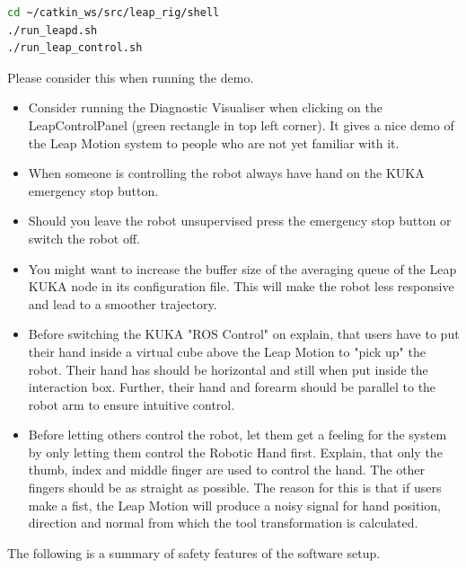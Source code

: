 \documentclass[headsepline,footinclude=false,fontsize=11pt,paper=a4,listof=totoc,bibliography=totoc,BCOR=12mm,DIV=14]{scrbook}
\begin{document}
\begin{lstlisting}[language=bash, caption={Launching Leap Rig demo}, label={shell}]
cd ~/catkin_ws/src/leap_rig/shell
./run_leapd.sh
./run_leap_control.sh
\end{lstlisting}


Please consider this when running the demo.
\begin{itemize}
	\item Consider running the Diagnostic Visualiser when clicking on the LeapControlPanel (green rectangle in top left corner). It gives a nice demo of the Leap Motion system to people who are not yet familiar with it. 
	\item When someone is controlling the robot always have hand on the KUKA emergency stop button.
	\item Should you leave the robot unsupervised press the emergency stop button or switch the robot off.
	\item You might want to increase the buffer size of the averaging queue of the Leap KUKA node in its configuration file. This will make the robot less responsive and lead to a smoother trajectory. 
	\item Before switching the KUKA "ROS Control" on explain, that users have to put their hand inside a virtual cube above the Leap Motion to "pick up" the robot. Their hand has should be horizontal and still when put inside the interaction box. Further, their hand and forearm should be parallel to the robot arm to ensure intuitive control.
	\item Before letting others control the robot, let them get a feeling for the system by only letting them control the Robotic Hand first. Explain, that only the thumb, index and middle finger are used to control the hand. The other fingers should be as straight as possible. The reason for this is that if users make a fist, the Leap Motion will produce a noisy signal for hand position, direction and normal from which the tool transformation is calculated.
\end{itemize}

\newpage
The following is a summary of safety features of the software setup.
\end{document}
